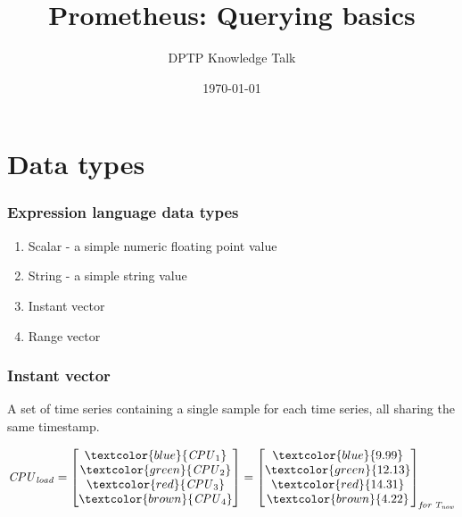 \documentclass[xcolor=dvipsnames]{beamer}
\title[Prometheus: Querying basics]{Prometheus: Querying basics}
\date{\today}
\author[Jakub Guzik]
{DPTP Knowledge Talk}
\newcommand{\mli}[1]{\mathit{#1}}
\begin{document}
	\begin{frame}
		\titlepage
	\end{frame}

	\begin{frame}
		\tableofcontents
	\end{frame}

	\section{Data types}


	\begin{frame}
	\frametitle{Expression language data types}
		\begin{enumerate}
			\item Scalar - a simple numeric floating point value
\item String - a simple string value
\item Instant vector
\item Range vector
		\end{enumerate}
	\end{frame}
	\begin{frame}
	\frametitle{Instant vector}
A set of time series containing a single sample for each time series, all sharing the same timestamp.

\[
\mli{CPU} _ \mli{load}=
\begin{bmatrix}
    \textcolor{blue}{\mli{CPU}_1}      \\
    \textcolor{green}{\mli{CPU}_2}   \\
    \textcolor{red}{\mli{CPU}_3}   \\
    \textcolor{brown}{\mli{CPU}_4}
\end{bmatrix}
=
\begin{bmatrix}
    \textcolor{blue}{9.99}      \\
    \textcolor{green}{12.13}   \\
    \textcolor{red}{14.31}   \\
    \textcolor{brown}{4.22}

\end{bmatrix} _{\mli{for\: T_{\mli{now}}}}
\]

\end{frame}
\end{document}
